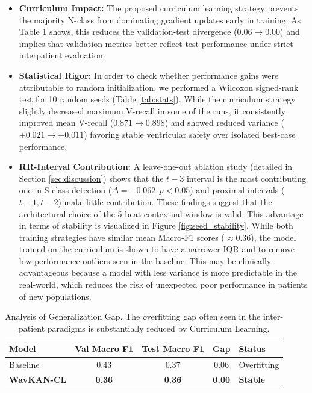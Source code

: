 \documentclass[pdflatex,sn-mathphys-num]{sn-jnl}
\theoremstyle{thmstyleone}
\theoremstyle{thmstyletwo}
\theoremstyle{thmstylethree}
\begin{document}
\begin{itemize}
    \item \textbf{Curriculum Impact:} The proposed curriculum learning strategy prevents the majority N-class from dominating gradient updates early in training. As Table \ref{tab:gap} shows, this reduces the validation-test divergence ($0.06 \to 0.00$) and implies that validation metrics better reflect test performance under strict interpatient evaluation.
    \item \textbf{Statistical Rigor:} In order to check whether performance gains were attributable to random initialization, we performed a Wilcoxon signed-rank test for 10 random seeds (Table \ref{tab:stats}). While the curriculum strategy slightly decreased maximum V-recall in some of the runs, it consistently improved mean V-recall ($0.871 \to 0.898$) and showed reduced variance ($\pm 0.021 \to \pm 0.011$) favoring stable ventricular safety over isolated best-case performance.
    \item \textbf{RR-Interval Contribution:} A leave-one-out ablation study (detailed in Section \ref{sec:discussion}) shows that the $t-3$ interval is the most contributing one in S-class detection ($\Delta = -0.062, p < 0.05$) and proximal intervals ($t-1, t-2$) make little contribution. These findings suggest that the architectural choice of the 5-beat contextual window is valid. This advantage in terms of stability is visualized in Figure \ref{fig:seed_stability}. While both training strategies have similar mean Macro-F1 scores ($\approx 0.36$), the model trained on the curriculum is shown to have a narrower IQR and to remove low performance outliers seen in the baseline. This may be clinically advantageous because a model with less variance is more predictable in the real-world, which reduces the risk of unexpected poor performance in patients of new populations.
\end{itemize}

\begin{table}[ht]
\centering
\caption{Analysis of Generalization Gap. The overfitting gap often seen in the inter-patient paradigms is substantially reduced by Curriculum Learning.}
\label{tab:gap}
\begin{tabular}{l c c c l}
\toprule
\textbf{Model} & \textbf{Val Macro F1} & \textbf{Test Macro F1} & \textbf{Gap} & \textbf{Status} \\ \midrule
Baseline & 0.43 & 0.37 & 0.06 & Overfitting \\
\textbf{WavKAN-CL} & \textbf{0.36} & \textbf{0.36} & \textbf{0.00} & \textbf{Stable} \\ \bottomrule
\end{tabular}
\end{table}
\end{document}
